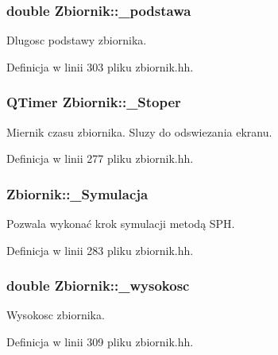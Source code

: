 \subsubsection[{\+\_\+podstawa}]{\setlength{\rightskip}{0pt plus 5cm}double Zbiornik\+::\+\_\+podstawa\hspace{0.3cm}{\ttfamily [private]}}\label{class_zbiornik_aff57d3fb370566986df4eb58711cbfae}
Dlugosc podstawy zbiornika. 

Definicja w linii 303 pliku zbiornik.\+hh.

\hypertarget{class_zbiornik_a5ca8ac1357ef59110d4a9e12aae2bd99}{}
\subsubsection[{\+\_\+\+Stoper}]{\setlength{\rightskip}{0pt plus 5cm}Q\+Timer Zbiornik\+::\+\_\+\+Stoper}\label{class_zbiornik_a5ca8ac1357ef59110d4a9e12aae2bd99}
Miernik czasu zbiornika. Sluzy do odswiezania ekranu. 

Definicja w linii 277 pliku zbiornik.\+hh.

\hypertarget{class_zbiornik_a2d1f5a0b8fb0085afcd66b730d6dd6a8}{}
\subsubsection[{\+\_\+\+Symulacja}]{ Zbiornik\+::\+\_\+\+Symulacja}\label{class_zbiornik_a2d1f5a0b8fb0085afcd66b730d6dd6a8}
Pozwala wykonać krok symulacji metodą S\+P\+H. 

Definicja w linii 283 pliku zbiornik.\+hh.

\hypertarget{class_zbiornik_abe4d7a4e2d39e802d656b03bb3afdd3f}{}
\subsubsection[{\+\_\+wysokosc}]{\setlength{\rightskip}{0pt plus 5cm}double Zbiornik\+::\+\_\+wysokosc\hspace{0.3cm}{\ttfamily [private]}}\label{class_zbiornik_abe4d7a4e2d39e802d656b03bb3afdd3f}
Wysokosc zbiornika. 

Definicja w linii 309 pliku zbiornik.\+hh.

